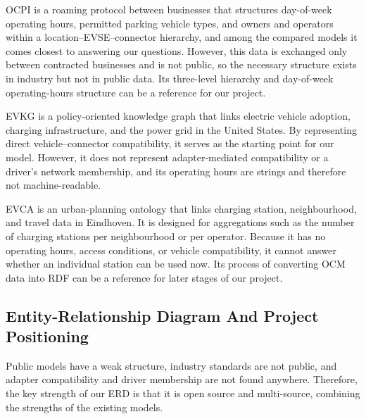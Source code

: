 \documentclass[sigconf]{acmart}
\begin{document}
OCPI is a roaming protocol between businesses that structures day-of-week operating hours, permitted parking vehicle types, and owners and operators within a location–EVSE–connector hierarchy, and among the compared models it comes closest to answering our questions. However, this data is exchanged only between contracted businesses and is not public, so the necessary structure exists in industry but not in public data. Its three-level hierarchy and day-of-week operating-hours structure can be a reference for our project.

EVKG is a policy-oriented knowledge graph that links electric vehicle adoption, charging infrastructure, and the power grid in the United States. By representing direct vehicle–connector compatibility, it serves as the starting point for our model. However, it does not represent adapter-mediated compatibility or a driver's network membership, and its operating hours are strings and therefore not machine-readable.

EVCA is an urban-planning ontology that links charging station, neighbourhood, and travel data in Eindhoven. It is designed for aggregations such as the number of charging stations per neighbourhood or per operator. Because it has no operating hours, access conditions, or vehicle compatibility, it cannot answer whether an individual station can be used now. Its process of converting OCM data into RDF can be a reference for later stages of our project.


\subsection{Entity-Relationship Diagram And Project Positioning}

Public models have a weak structure, industry standards are not public, and adapter compatibility and driver membership are not found anywhere. Therefore, the key strength of our ERD is that it is open source and multi-source, combining the strengths of the existing models.
\end{document}
